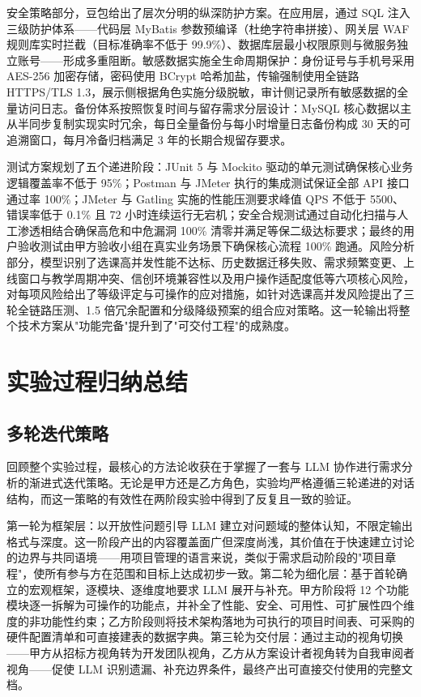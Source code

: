 \documentclass[12pt, a4paper]{academics}
\begin{document}
安全策略部分，豆包给出了层次分明的纵深防护方案。在应用层，通过 SQL 注入三级防护体系——代码层 MyBatis 参数预编译（杜绝字符串拼接）、网关层 WAF 规则库实时拦截（目标准确率不低于 99.9\%）、数据库层最小权限原则与微服务独立账号——形成多重阻断。敏感数据实施全生命周期保护：身份证号与手机号采用 AES-256 加密存储，密码使用 BCrypt 哈希加盐，传输强制使用全链路 HTTPS/TLS 1.3，展示侧根据角色实施分级脱敏，审计侧记录所有敏感数据的全量访问日志。备份体系按照恢复时间与留存需求分层设计：MySQL 核心数据以主从半同步复制实现实时冗余，每日全量备份与每小时增量日志备份构成 30 天的可追溯窗口，每月冷备归档满足 3 年的长期合规留存要求。

测试方案规划了五个递进阶段：JUnit 5 与 Mockito 驱动的单元测试确保核心业务逻辑覆盖率不低于 95\%；Postman 与 JMeter 执行的集成测试保证全部 API 接口通过率 100\%；JMeter 与 Gatling 实施的性能压测要求峰值 QPS 不低于 5500、错误率低于 0.1\% 且 72 小时连续运行无宕机；安全合规测试通过自动化扫描与人工渗透相结合确保高危和中危漏洞 100\% 清零并满足等保二级达标要求；最终的用户验收测试由甲方验收小组在真实业务场景下确保核心流程 100\% 跑通。风险分析部分，模型识别了选课高并发性能不达标、历史数据迁移失败、需求频繁变更、上线窗口与教学周期冲突、信创环境兼容性以及用户操作适配度低等六项核心风险，对每项风险给出了等级评定与可操作的应对措施，如针对选课高并发风险提出了三轮全链路压测、1.5 倍冗余配置和分级降级预案的组合应对策略。这一轮输出将整个技术方案从"功能完备"提升到了"可交付工程"的成熟度。

\section{实验过程归纳总结}

\subsection{多轮迭代策略}

回顾整个实验过程，最核心的方法论收获在于掌握了一套与 LLM 协作进行需求分析的渐进式迭代策略。无论是甲方还是乙方角色，实验均严格遵循三轮递进的对话结构，而这一策略的有效性在两阶段实验中得到了反复且一致的验证。

第一轮为框架层：以开放性问题引导 LLM 建立对问题域的整体认知，不限定输出格式与深度。这一阶段产出的内容覆盖面广但深度尚浅，其价值在于快速建立讨论的边界与共同语境——用项目管理的语言来说，类似于需求启动阶段的"项目章程"，使所有参与方在范围和目标上达成初步一致。第二轮为细化层：基于首轮确立的宏观框架，逐模块、逐维度地要求 LLM 展开与补充。甲方阶段将 12 个功能模块逐一拆解为可操作的功能点，并补全了性能、安全、可用性、可扩展性四个维度的非功能性约束；乙方阶段则将技术架构落地为可执行的项目时间表、可采购的硬件配置清单和可直接建表的数据字典。第三轮为交付层：通过主动的视角切换——甲方从招标方视角转为开发团队视角，乙方从方案设计者视角转为自我审阅者视角——促使 LLM 识别遗漏、补充边界条件，最终产出可直接交付使用的完整文档。
\end{document}
